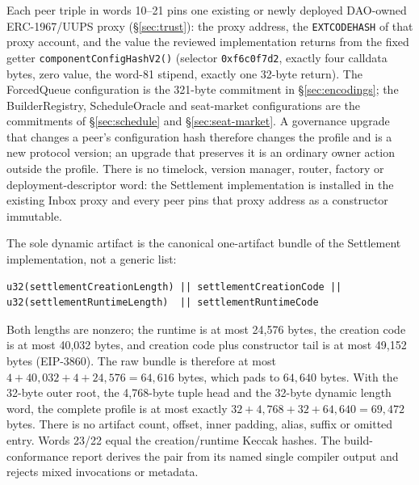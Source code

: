 \documentclass[a4paper,11pt]{article}
\newcommand{\code}[1]{\nolinkurl{#1}}
\begin{document}
Each peer triple in words 10--21 pins one existing or newly deployed
DAO-owned ERC-1967/UUPS proxy (\S\ref{sec:trust}): the proxy address, the
\code{EXTCODEHASH} of that proxy account, and the value the reviewed
implementation returns from the fixed getter
\code{componentConfigHashV2()} (selector \code{0xf6c0f7d2}, exactly four
calldata bytes, zero value, the word-81 stipend, exactly one 32-byte return).
The ForcedQueue configuration is the 321-byte commitment in
\S\ref{sec:encodings}; the BuilderRegistry, ScheduleOracle and seat-market
configurations are the commitments of \S\ref{sec:schedule} and
\S\ref{sec:seat-market}.  A governance upgrade that changes a peer's
configuration hash therefore changes the profile and is a new protocol
version; an upgrade that preserves it is an ordinary owner action outside the
profile.  There is no timelock, version manager, router, factory or
deployment-descriptor word: the Settlement implementation is installed in the
existing Inbox proxy and every peer pins that proxy address as a constructor
immutable.

The sole dynamic artifact is the canonical one-artifact bundle of the
Settlement implementation, not a generic list:
\begin{verbatim}
u32(settlementCreationLength) || settlementCreationCode ||
u32(settlementRuntimeLength)  || settlementRuntimeCode
\end{verbatim}
Both lengths are nonzero; the runtime is at most 24,576 bytes, the creation
code is at most 40,032 bytes, and creation code plus constructor tail is at
most 49,152 bytes (EIP-3860).  The raw bundle is therefore at most
\(4+40{,}032+4+24{,}576=64{,}616\) bytes, which pads to \(64{,}640\) bytes.
With the 32-byte outer root, the 4,768-byte tuple head and the 32-byte dynamic
length word, the complete profile is at most exactly
\(32+4{,}768+32+64{,}640=69{,}472\) bytes.  There is no artifact count, offset,
inner padding, alias, suffix or omitted entry.  Words 23/22 equal the
creation/runtime Keccak hashes.  The build-conformance report derives the pair
from its named single compiler output and rejects mixed invocations or
metadata.
\end{document}
